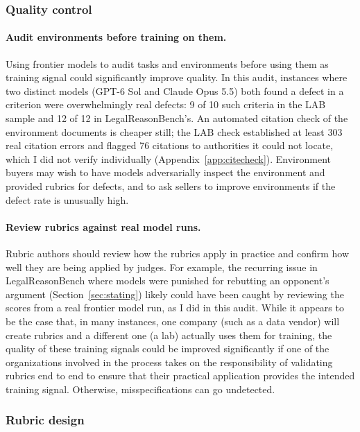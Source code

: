 \documentclass[11pt]{article}
\newcommand{\labBothFlagged}{10}
\newcommand{\labBothDefective}{9}
\newcommand{\lrbBothFlagged}{12}
\newcommand{\lrbBothDefective}{12}
\newcommand{\labCitationsNotFound}{76}
\newcommand{\labCitationErrorsLB}{303}
\begin{document}
\subsubsection{Quality control}

\paragraph{Audit environments before training on them.} Using frontier models to audit tasks and environments before using them as training signal could significantly improve quality. In this audit, instances where two distinct models (GPT-6 Sol and Claude Opus 5.5) both found a defect in a criterion were overwhelmingly real defects: \labBothDefective{} of \labBothFlagged{} such criteria in the LAB sample and \lrbBothDefective{} of \lrbBothFlagged{} in LegalReasonBench's. An automated citation check of the environment documents is cheaper still; the LAB check established at least \labCitationErrorsLB{} real citation errors and flagged \labCitationsNotFound{} citations to authorities it could not locate, which I did not verify individually (Appendix~\ref{app:citecheck}). Environment buyers may wish to have models adversarially inspect the environment and provided rubrics for defects, and to ask sellers to improve environments if the defect rate is unusually high.

\paragraph{Review rubrics against real model runs.} Rubric authors should review how the rubrics apply in practice and confirm how well they are being applied by judges. For example, the recurring issue in LegalReasonBench where models were punished for rebutting an opponent's argument (Section~\ref{sec:stating}) likely could have been caught by reviewing the scores from a real frontier model run, as I did in this audit. While it appears to be the case that, in many instances, one company (such as a data vendor) will create rubrics and a different one (a lab) actually uses them for training, the quality of these training signals could be improved significantly if one of the organizations involved in the process takes on the responsibility of validating rubrics end to end to ensure that their practical application provides the intended training signal. Otherwise, misspecifications can go undetected.

\subsubsection{Rubric design}
\end{document}
